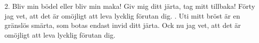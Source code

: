 \setlength{\columnsep}{1.0cm}
\begin{multicols}{2}
2.  Bliv min bödel eller bliv min maka!
    Giv mig ditt järta, tag mitt tillbaka!
    Förty jag vet, att det är omöjligt
    att leva lycklig förutan dig.
\vfill{}.  Uti mitt bröst är en gränslös smärta,
    som botas endast invid ditt järta.
    Ock nu jag vet, att det är omöjligt
    att leva lycklig förutan dig.
\end{multicols}